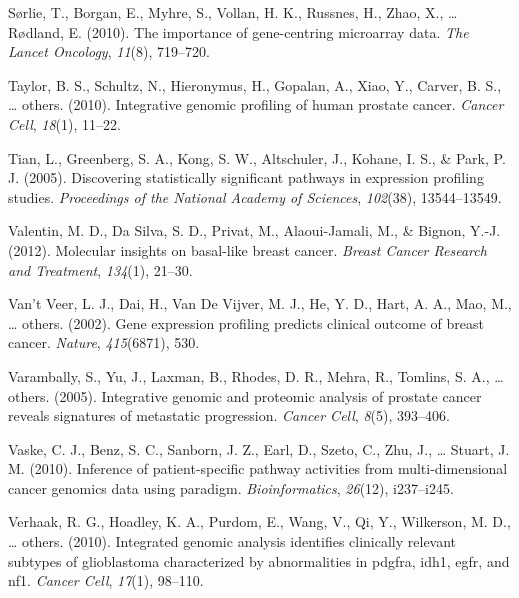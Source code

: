 \documentclass[12pt,twoside]{reedthesis}
\begin{document}
\leavevmode\hypertarget{ref-sorlie2010importance}{}%
Sørlie, T., Borgan, E., Myhre, S., Vollan, H. K., Russnes, H., Zhao, X., \ldots{} Rødland, E. (2010). The importance of gene-centring microarray data. \emph{The Lancet Oncology}, \emph{11}(8), 719--720.

\leavevmode\hypertarget{ref-taylor2010integrative}{}%
Taylor, B. S., Schultz, N., Hieronymus, H., Gopalan, A., Xiao, Y., Carver, B. S., \ldots{} others. (2010). Integrative genomic profiling of human prostate cancer. \emph{Cancer Cell}, \emph{18}(1), 11--22.

\leavevmode\hypertarget{ref-tian2005discovering}{}%
Tian, L., Greenberg, S. A., Kong, S. W., Altschuler, J., Kohane, I. S., \& Park, P. J. (2005). Discovering statistically significant pathways in expression profiling studies. \emph{Proceedings of the National Academy of Sciences}, \emph{102}(38), 13544--13549.

\leavevmode\hypertarget{ref-valentin2012molecular}{}%
Valentin, M. D., Da Silva, S. D., Privat, M., Alaoui-Jamali, M., \& Bignon, Y.-J. (2012). Molecular insights on basal-like breast cancer. \emph{Breast Cancer Research and Treatment}, \emph{134}(1), 21--30.

\leavevmode\hypertarget{ref-van2002gene}{}%
Van't Veer, L. J., Dai, H., Van De Vijver, M. J., He, Y. D., Hart, A. A., Mao, M., \ldots{} others. (2002). Gene expression profiling predicts clinical outcome of breast cancer. \emph{Nature}, \emph{415}(6871), 530.

\leavevmode\hypertarget{ref-varambally2005integrative}{}%
Varambally, S., Yu, J., Laxman, B., Rhodes, D. R., Mehra, R., Tomlins, S. A., \ldots{} others. (2005). Integrative genomic and proteomic analysis of prostate cancer reveals signatures of metastatic progression. \emph{Cancer Cell}, \emph{8}(5), 393--406.

\leavevmode\hypertarget{ref-vaske2010inference}{}%
Vaske, C. J., Benz, S. C., Sanborn, J. Z., Earl, D., Szeto, C., Zhu, J., \ldots{} Stuart, J. M. (2010). Inference of patient-specific pathway activities from multi-dimensional cancer genomics data using paradigm. \emph{Bioinformatics}, \emph{26}(12), i237--i245.

\leavevmode\hypertarget{ref-verhaak2010integrated}{}%
Verhaak, R. G., Hoadley, K. A., Purdom, E., Wang, V., Qi, Y., Wilkerson, M. D., \ldots{} others. (2010). Integrated genomic analysis identifies clinically relevant subtypes of glioblastoma characterized by abnormalities in pdgfra, idh1, egfr, and nf1. \emph{Cancer Cell}, \emph{17}(1), 98--110.
\end{document}
